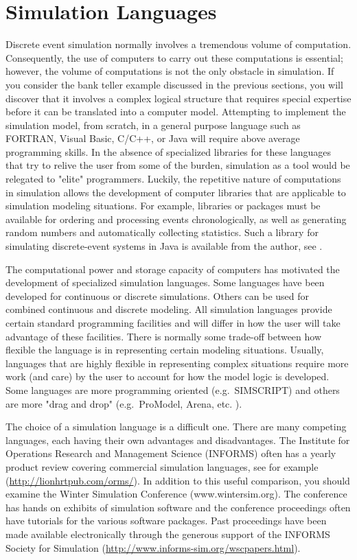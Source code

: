\documentclass[
]{book}
\theoremstyle{definition}
\theoremstyle{definition}
\theoremstyle{definition}
\theoremstyle{definition}
\theoremstyle{remark}
\begin{document}
\hypertarget{simulation-languages}{%
\section{Simulation Languages}\label{simulation-languages}}

Discrete event simulation normally involves a tremendous volume of
computation. Consequently, the use of computers to carry out these
computations is essential; however, the volume of computations is not
the only obstacle in simulation. If you consider the bank teller example
discussed in the previous sections, you will discover that it involves a
complex logical structure that requires special expertise before it can
be translated into a computer model. Attempting to implement the
simulation model, from scratch, in a general purpose language such as
FORTRAN, Visual Basic, C/C++, or Java will require above average
programming skills. In the absence of specialized libraries for these
languages that try to relive the user from some of the burden,
simulation as a tool would be relegated to "elite" programmers.
Luckily, the repetitive nature of computations in simulation allows the
development of computer libraries that are applicable to simulation
modeling situations. For example, libraries or packages must be
available for ordering and processing events chronologically, as well as
generating random numbers and automatically collecting statistics. Such
a library for simulating discrete-event systems in Java is available
from the author, see \citep{Rossetti2008aa}.

The computational power and storage capacity of computers has motivated
the development of specialized simulation languages. Some languages have
been developed for continuous or discrete simulations. Others can be
used for combined continuous and discrete modeling. All simulation
languages provide certain standard programming facilities and will
differ in how the user will take advantage of these facilities. There is
normally some trade-off between how flexible the language is in
representing certain modeling situations. Usually, languages that are
highly flexible in representing complex situations require more work
(and care) by the user to account for how the model logic is developed.
Some languages are more programming oriented (e.g.~SIMSCRIPT) and others
are more "drag and drop" (e.g.~ProModel, Arena, etc. ).

The choice of a simulation language is a difficult one. There are many
competing languages, each having their own advantages and disadvantages.
The Institute for Operations Research and Management Science (INFORMS)
often has a yearly product review covering commercial simulation
languages, see for example (\url{http://lionhrtpub.com/orms/}). In addition to
this useful comparison, you should examine the Winter Simulation
Conference (www.wintersim.org). The conference has hands on exhibits of
simulation software and the conference proceedings often have tutorials
for the various software packages. Past proceedings have been made
available electronically through the generous support of the INFORMS
Society for Simulation (\url{http://www.informs-sim.org/wscpapers.html}).
\end{document}
